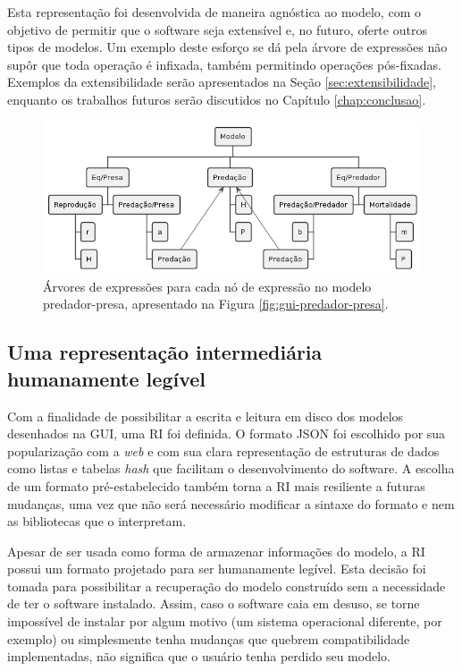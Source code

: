 \documentclass[
	12pt,				%
	openright,			%
	oneside,			%
	a4paper,			%
	main=brazil,
	english,			%
	]{ufsj-abntex2}
\begin{document}
Esta representação foi desenvolvida de maneira agnóstica ao modelo, com o objetivo de permitir que o software seja extensível e, no futuro, oferte outros tipos de modelos. Um exemplo deste esforço se dá pela árvore de expressões não supôr que toda operação é infixada, também permitindo operações pós-fixadas. Exemplos da extensibilidade serão apresentados na Seção \ref{sec:extensibilidade}, enquanto os trabalhos futuros serão discutidos no Capítulo \ref{chap:conclusao}.

\begin{figure}[h]
    \centering
    \includegraphics[scale=0.63]{diagrams/img/expr-tree.png} 
    \caption{Árvores de expressões para cada nó de expressão no modelo predador-presa, apresentado na Figura \ref{fig:gui-predador-presa}.}
    \label{fig:expr-tree}
\end{figure}

\subsection{Uma representação intermediária humanamente legível}
\label{subsection:RI}

Com a finalidade de possibilitar a escrita e leitura em disco dos modelos desenhados na GUI, uma RI foi definida. O formato JSON foi escolhido por sua popularização com a \textit{web} e com sua clara representação de estruturas de dados como listas e tabelas \textit{hash} que facilitam o desenvolvimento do software. A escolha de um formato pré-estabelecido também torna a RI mais resiliente a futuras mudanças, uma vez que não será necessário modificar a sintaxe do formato e nem as bibliotecas que o interpretam.

Apesar de ser usada como forma de armazenar informações do modelo, a RI possui um formato projetado para ser humanamente legível. Esta decisão foi tomada para possibilitar a recuperação do modelo construído sem a necessidade de ter o software instalado. Assim, caso o software caia em desuso, se torne impossível de instalar por algum motivo (um sistema operacional diferente, por exemplo) ou simplesmente tenha mudanças que quebrem compatibilidade implementadas, não significa que o usuário tenha perdido seu 
modelo.
\end{document}
